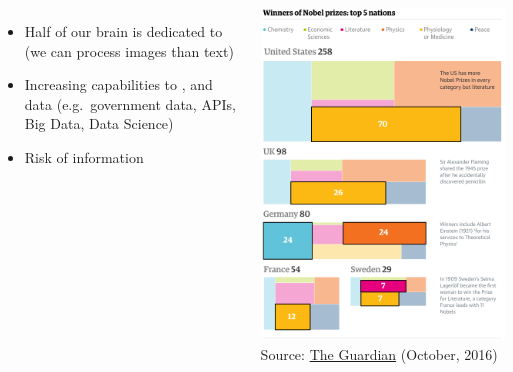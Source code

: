 \documentclass[8pt]{beamer}
\begin{document}
\begin{frame}
\frametitle{\insertsection}

\begin{columns}[c]
    \begin{itemize}
    \item Half of our brain is dedicated to {\color{blue}{processing visual signals}} (we can process images {\color{blue}{60,000 times faster}} than text)
    \item Increasing capabilities to {\color{blue}{collect}}, {\color{blue}{store}} and {\color{blue}{analyse}} data (e.g.\ government data, APIs, Big Data, Data Science)
    \item Risk of information {\color{red}{overload}}
\end{itemize}

\centering
\includegraphics[width=\linewidth]{nobel}\\
\tiny{Source: \href{www.theguardian.com/science/datablog/2016/oct/08/which-countries-have-had-the-most-nobel-prize-winners}{The Guardian} (October, 2016)}

\end{columns}

\end{frame}
\end{document}
